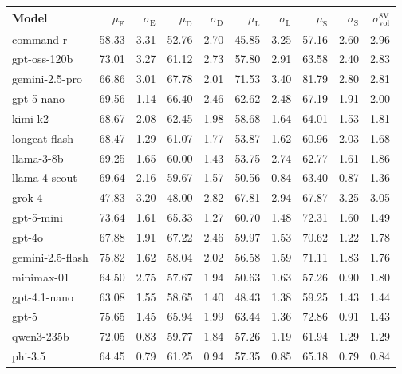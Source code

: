\documentclass[11pt]{article}
\begin{document}
\begin{table}[t]
\centering
\scriptsize
\setlength{\tabcolsep}{2.2pt}
\begin{tabular}{l r r r r r r r r r}
\toprule
\textbf{Model} &
$\mu_{\text{E}}$ & $\sigma_{\text{E}}$ &
$\mu_{\text{D}}$ & $\sigma_{\text{D}}$ &
$\mu_{\text{L}}$ & $\sigma_{\text{L}}$ &
$\mu_{\text{S}}$ & $\sigma_{\text{S}}$ &
$\sigma^{\text{8V}}_{\text{vol}}$ \\
\midrule
command-r        & 58.33 & 3.31 & 52.76 & 2.70 & 45.85 & 3.25 & 57.16 & 2.60 & 2.96 \\
gpt-oss-120b     & 73.01 & 3.27 & 61.12 & 2.73 & 57.80 & 2.91 & 63.58 & 2.40 & 2.83 \\
gemini-2.5-pro   & 66.86 & 3.01 & 67.78 & 2.01 & 71.53 & 3.40 & 81.79 & 2.80 & 2.81 \\
gpt-5-nano       & 69.56 & 1.14 & 66.40 & 2.46 & 62.62 & 2.48 & 67.19 & 1.91 & 2.00 \\
kimi-k2          & 68.67 & 2.08 & 62.45 & 1.98 & 58.68 & 1.64 & 64.01 & 1.53 & 1.81 \\
longcat-flash    & 68.47 & 1.29 & 61.07 & 1.77 & 53.87 & 1.62 & 60.96 & 2.03 & 1.68 \\
llama-3-8b       & 69.25 & 1.65 & 60.00 & 1.43 & 53.75 & 2.74 & 62.77 & 1.61 & 1.86 \\
llama-4-scout    & 69.64 & 2.16 & 59.67 & 1.57 & 50.56 & 0.84 & 63.40 & 0.87 & 1.36 \\
grok-4           & 47.83 & 3.20 & 48.00 & 2.82 & 67.81 & 2.94 & 67.87 & 3.25 & 3.05 \\
gpt-5-mini       & 73.64 & 1.61 & 65.33 & 1.27 & 60.70 & 1.48 & 72.31 & 1.60 & 1.49 \\
gpt-4o           & 67.88 & 1.91 & 67.22 & 2.46 & 59.97 & 1.53 & 70.62 & 1.22 & 1.78 \\
gemini-2.5-flash & 75.82 & 1.62 & 58.04 & 2.02 & 56.58 & 1.59 & 71.11 & 1.83 & 1.76 \\
minimax-01       & 64.50 & 2.75 & 57.67 & 1.94 & 50.63 & 1.63 & 57.26 & 0.90 & 1.80 \\
gpt-4.1-nano     & 63.08 & 1.55 & 58.65 & 1.40 & 48.43 & 1.38 & 59.25 & 1.43 & 1.44 \\
gpt-5            & 75.65 & 1.45 & 65.94 & 1.99 & 63.44 & 1.36 & 72.86 & 0.91 & 1.43 \\
qwen3-235b       & 72.05 & 0.83 & 59.77 & 1.84 & 57.26 & 1.19 & 61.94 & 1.29 & 1.29 \\
phi-3.5          & 64.45 & 0.79 & 61.25 & 0.94 & 57.35 & 0.85 & 65.18 & 0.79 & 0.84 \\

\end{tabular}
\end{table}
\end{document}
